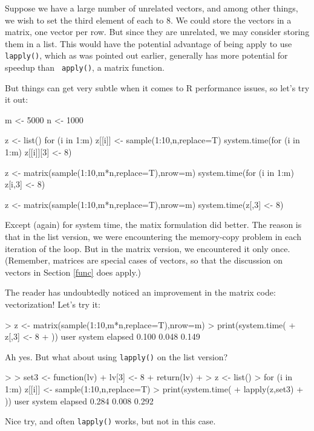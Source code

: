 Suppose we have a large number of unrelated vectors, and among other
things, we wish to set the third element of each to 8.  We could store
the vectors in a matrix, one vector per row.  But since they are
unrelated, we may consider storing them in a list.  This would have the
potential advantage of being apply to use {\tt lapply()}, which as was
pointed out earlier, generally has more potential for speedup than {\tt
apply()}, a matrix function.  

But things can get very subtle when it comes to R performance issues, so
let's try it out:

\begin{Code}
m  <- 5000
n <- 1000

z <- list()
for (i in 1:m) z[[i]] <- sample(1:10,n,replace=T)
system.time(for (i in 1:m) z[[i]][3] <- 8)

z <- matrix(sample(1:10,m*n,replace=T),nrow=m)
system.time(for (i in 1:m) z[i,3] <- 8)

z <- matrix(sample(1:10,m*n,replace=T),nrow=m)
system.time(z[,3] <- 8)
\end{Code}

\noindent
Except (again) for system time, the matix formulation did better.  The
reason is that in the list version, we were encountering the memory-copy
problem in each iteration of the loop.  But in the matrix version, we
encountered it only once.  (Remember, matrices are special cases of
vectors, so that the discussion on vectors in Section \ref{func} does
apply.)

The reader has undoubtedly noticed an improvement in the matrix
code:  vectorization!  Let's try it:

\begin{Code}
> z <- matrix(sample(1:10,m*n,replace=T),nrow=m)
> print(system.time({
+    z[,3] <- 8
+ }))
   user  system elapsed 
  0.100   0.048   0.149 
\end{Code}

\noindent
Ah yes.  But what about using {\tt lapply()} on the list version?

\begin{Code}
> 
> set3 <- function(lv) {
+    lv[3] <- 8
+    return(lv)
+ }
> z <- list()
> for (i in 1:m) z[[i]] <- sample(1:10,n,replace=T)
> print(system.time({
+    lapply(z,set3)
+ }))
   user  system elapsed 
  0.284   0.008   0.292 
\end{Code}

\noindent
Nice try, and often {\tt lapply()} works, but not in this case. 

